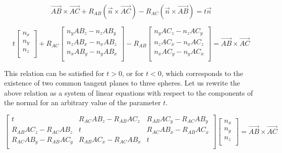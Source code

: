 \documentclass[
11pt,%
tightenlines,%
twoside,%
onecolumn,%
nofloats,%
nobibnotes,%
nofootinbib,%
superscriptaddress,%
noshowpacs,%
centertags]%
{revtex4}
\begin{document}
\begin{equation}
\vec{AB} \times \vec{AC} + R_{AB} (\vec{n} \times \vec{AC}) - R_{AC} (\vec{n} \times \vec{AB}) = t \vec{n}
\end{equation}

\begin{equation}
t
\left[ { \begin{array}{c}
            n_x \\
            n_y \\
            n_z \\
         \end{array} } \right]
+ R_{AC}
\left[ { \begin{array}{c}
            n_y AB_z - n_z AB_y  \\
            n_z AB_x - n_x AB_z \\
            n_x AB_y - n_y AB_x \\
         \end{array} } \right]
- R_{AB}
\left[ { \begin{array}{c}
            n_y AC_z - n_z AC_y \\
            n_z AC_x - n_x AC_z \\
            n_x AC_y - n_y AC_x \\
         \end{array} } \right]
= \vec{AB} \times \vec{AC}
\end{equation}

This relation can be satisfied for $t > 0$, or for $t < 0$, which corresponds to the existence of two common tangent planes to three spheres.
Let us rewrite the above relation as a system of linear equations with respect to the components of the normal for an arbitrary value of the parameter $t$.

\begin{equation}
\left[ { \begin{array}{ccc}
             t & R_{AC} AB_z - R_{AB} AC_z & R_{AB} AC_y - R_{AC} AB_y \\
             R_{AB} AC_z - R_{AC} AB_z & t & R_{AC} AB_x - R_{AB} AC_x \\
             R_{AC} AB_y - R_{AB} AC_y & R_{AB} AC_x - R_{AC} AB_x & t \\
         \end{array} } \right]
\left[ { \begin{array}{c}
            n_x \\
            n_y \\
            n_z \\
         \end{array} } \right]
= \vec{AB} \times \vec{AC}
\end{equation}
\end{document}
